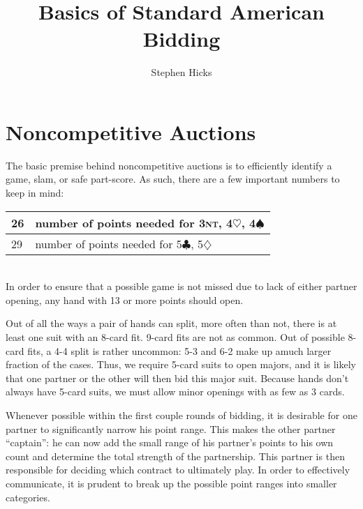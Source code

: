 \documentclass[11pt]{article}
\title{Basics of Standard American Bidding}
\author{Stephen Hicks}
\def\C{$\clubsuit$}
\def\D{$\diamondsuit$}
\def\H{$\heartsuit$}
\def\S{$\spadesuit$}
\def\NT{\textsc{nt}}
\begin{document}
\maketitle
\section{Noncompetitive Auctions}
The basic premise behind noncompetitive auctions is to
efficiently identify a game, slam, or safe part-score.
As such, there are a few important numbers to keep in mind:\\

\begin{tabular}{|l|l|}\hline
26 & number of points needed for 3\NT, 4\H, 4\S\\\hline
29 & number of points needed for 5\C, 5\D\\\hline
\end{tabular}\\

In order to ensure that a possible game is not missed due to
lack of either partner opening, any hand with 13 or more points
should open.

Out of all the ways a pair of hands can split, more often than not,
there is at least one suit with an 8-card fit.  9-card fits are not as
common.  Out of possible 8-card fits, a 4-4 split is rather uncommon:
5-3 and 6-2 make up amuch larger fraction of the cases.  Thus, we
require 5-card suits to open majors, and it is likely that one partner
or the other will then bid this major suit.  Because hands don't
always have 5-card suits, we must allow minor openings with as few as
3 cards.

Whenever possible within the first couple rounds of bidding, it
is desirable for one partner to significantly narrow his point
range.  This makes the other partner ``captain'': he can now add
the small range of his partner's points to his own count and determine
the total strength of the partnership.  This partner is then responsible
for deciding which contract to ultimately play.  In order to effectively
communicate, it is prudent to break up the possible point ranges into
smaller categories.
\end{document}
